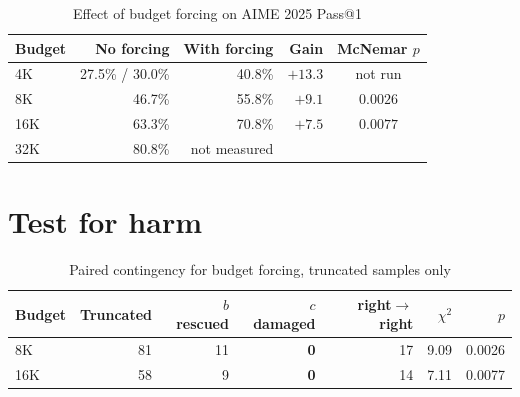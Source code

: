\documentclass[12pt,a4paper,oneside]{report}
\newif\ifdraft
\newcommand{\writehere}[2]{%
  \ifdraft
    \begin{tcolorbox}[colback=yellow!8,colframe=orange!55,
                      boxrule=0.6pt,left=6pt,right=6pt,top=4pt,bottom=4pt]
    {\small\textbf{WRITE: #1}\\[2pt]#2}
    \end{tcolorbox}
  \fi}
\begin{document}
\begin{table}[htbp]
\centering
\caption{Effect of budget forcing on AIME 2025 Pass@1}
\label{tab:main}
\small
\begin{tabular}{@{}lrrrc@{}}
\toprule
\textbf{Budget} & \textbf{No forcing} & \textbf{With forcing} & \textbf{Gain} &
\textbf{McNemar $p$} \\
\midrule
4K  & 27.5\% / 30.0\% & 40.8\% & $+13.3$ & not run \\
8K  & 46.7\%          & 55.8\% & $+9.1$  & $\mathbf{0.0026}$ \\
16K & 63.3\%          & 70.8\% & $+7.5$  & $\mathbf{0.0077}$ \\
32K & 80.8\%          & not measured & & \\
\bottomrule
\end{tabular}
\end{table}

\writehere{1 paragraph}{
The gain is significant at every budget where the paired test could be applied.
Explain the two baselines in the 4K row honestly: that budget was measured twice,
once by a dedicated run at 27.5 percent and once by truncating traces at 30.0
percent. Three samples apart, within noise, but different experiments, so they
should not be plotted as one series.}

\section{Test for harm}

\begin{table}[htbp]
\centering
\caption{Paired contingency for budget forcing, truncated samples only}
\label{tab:paired}
\small
\begin{tabular}{@{}lrrrrrr@{}}
\toprule
\textbf{Budget} & \textbf{Truncated} & \textbf{$b$ rescued} &
\textbf{$c$ damaged} & \textbf{right$\to$right} & \textbf{$\chi^2$} & \textbf{$p$} \\
\midrule
8K  & 81 & 11 & \textbf{0} & 17 & 9.09 & 0.0026 \\
16K & 58 & 9  & \textbf{0} & 14 & 7.11 & 0.0077 \\
\bottomrule
\end{tabular}
\end{table}

\writehere{1 paragraph, factual}{
Across 139 interventions $c$ equals zero. Note that 31 truncated traces already
contained a correct boxed expression and forcing re derived the identical value for
every one. Save the explanation for Chapter 6.}
\end{document}
